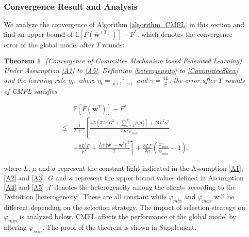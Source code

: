 \documentclass[10pt,journal,compsoc]{IEEEtran}
\newtheorem{theorem}{Theorem}
\newcommand{\w}{\mathbf{w}}
\begin{document}
\subsubsection{Convergence Result and Analysis}\label{convergence_result}

We analyze the convergence of Algorithm \ref{algorithm_CMFL} in this section and find an upper bound of $\mathbb{E}[F(\overline{\w}^{(T)})] - F^*$, which denotes the convergence error of the global model after $T$ rounds:

\begin{theorem}\label{theorem1}
(Convergence of Committee Mechanism based Federated Learning). \textit{Under Assumption \ref{A1} to \ref{A5}, Definition \ref{heterogeneity} to \ref{CommitteeSkew} and the learning rate $\eta_t$, where $ \eta_t = \frac{1}{\mu(t+\gamma)}$ and $\gamma = \frac{4L}{\mu}$, the error after $T$ rounds of CMFL satisfies}
\begin{small}
\begin{equation}
\begin{aligned}
&\mathbb{E}[F(\overline{\w}^{T})] - F^*\\
\leq& \frac{1}{T+\gamma}\left[ \frac{4L(32\tau^2G^2 + \sum_{k=1}^Kp_k\sigma_k^2) + 24L^2\kappa^2}{3\mu^2 \varphi_{min}} \right. \\
&\left. + \frac{8L^2\Gamma}{\mu^2}+\frac{L\gamma||\overline{\w}^{1} - \w^*||^2}{2}\right] + \frac{8L\Gamma}{3\mu}\left(\frac{\varphi_{max}}{\varphi_{min}}-1\right),
\end{aligned}
\end{equation}
\end{small}
\end{theorem}
where $L$, $\mu$ and $\sigma$ represent the constant light indicated in the Assumption \ref{A1}, \ref{A2} and \ref{A3}. $G$ and $\kappa$ represent the upper bound values defined in Assumption \ref{A4} and \ref{A5} .$\Gamma$ denotes the heterogeneity among the clients according to the Definition \ref{heterogeneity}. These are all constant while $\varphi_{min}$ and $\varphi_{max}$ will be different depending on the selection strategy. The impact of selection strategy on $\varphi_{min}$ is analyzed below. CMFL affects the performance of the global model by altering $\varphi_{min}$. The proof of the theorem is shown in Supplement. 
\end{document}
